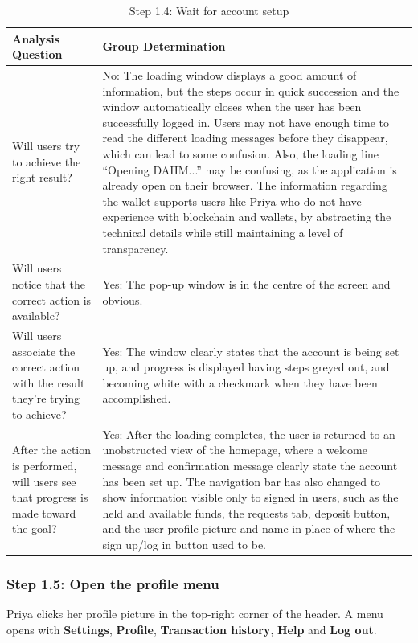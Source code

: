 \documentclass{article}
\begin{document}
\begin{table}[H]
    \centering
    \begin{tabularx}{\textwidth}{|p{5.5cm}|X|}
        \hline
        \textbf{Analysis Question} & \textbf{Group Determination} \\
        \hline
        Will users try to achieve the right result? & No: The loading window displays a good amount of information, but the steps occur in quick succession and the window automatically closes when the user has been successfully logged in. Users may not have enough time to read the different loading messages before they disappear, which can lead to some confusion. Also, the loading line ``Opening DAIIM...'' may be confusing, as the application is already open on their browser. The information regarding the wallet supports users like Priya who do not have experience with blockchain and wallets, by abstracting the technical details while still maintaining a level of transparency.  \\
        \hline
        Will users notice that the correct action is available? & Yes: The pop-up window is in the centre of the screen and obvious. \\
        \hline
        Will users associate the correct action with the result they're trying to achieve? & Yes: The window clearly states that the account is being set up, and progress is displayed having steps greyed out, and becoming white with a checkmark when they have been accomplished.  \\
        \hline
        After the action is performed, will users see that progress is made toward the goal? & Yes: After the loading completes, the user is returned to an unobstructed view of the homepage, where a welcome message and confirmation message clearly state the account has been set up. The navigation bar has also changed to show information visible only to signed in users, such as the held and available funds, the requests tab, deposit button, and the user profile picture and name in place of where the sign up/log in button used to be.  \\
        \hline
    \end{tabularx}
    \caption{Step 1.4: Wait for account setup}
    \label{tab:cw-step-1-4}
\end{table}

\subsubsection{Step 1.5: Open the profile menu}
Priya clicks her profile picture in the top-right corner of the header. A menu opens with \textbf{Settings}, \textbf{Profile}, \textbf{Transaction history}, \textbf{Help} and \textbf{Log out}.
\end{document}
